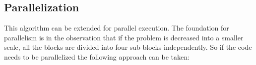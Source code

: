 
\subsection{Parallelization}
This algorithm can be extended for parallel execution. The foundation for
parallelism is in the observation that if the problem is decreased into a smaller scale, 
all the blocks are divided into four sub blocks independently. So if the code needs
to be parallelized the following approach can be taken:

